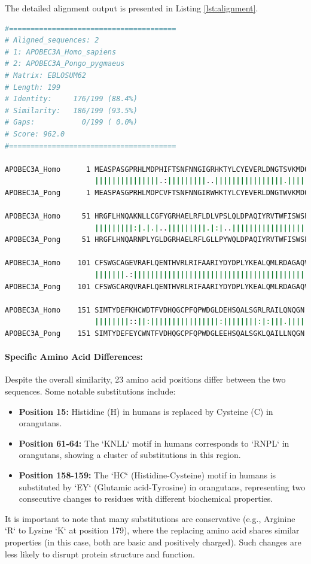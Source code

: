 \documentclass{article}
\begin{document}
The detailed alignment output is presented in Listing \ref{lst:alignment}.

\begin{lstlisting}[language=bash, caption={EMBOSS Needle Alignment Output}, label={lst:alignment}]
#=======================================
# Aligned_sequences: 2
# 1: APOBEC3A_Homo_sapiens
# 2: APOBEC3A_Pongo_pygmaeus
# Matrix: EBLOSUM62
# Length: 199
# Identity:     176/199 (88.4%)
# Similarity:   186/199 (93.5%)
# Gaps:           0/199 ( 0.0%)
# Score: 962.0
#=======================================

APOBEC3A_Homo      1 MEASPASGPRHLMDPHIFTSNFNNGIGRHKTYLCYEVERLDNGTSVKMDQ     50
                     |||||||||||||||.:|||||||||..||||||||||||||||.|||||
APOBEC3A_Pong      1 MEASPASGPRHLMDPCVFTSNFNNGIRWHKTYLCYEVERLDNGTWVKMDQ     50

APOBEC3A_Homo     51 HRGFLHNQAKNLLCGFYGRHAELRFLDLVPSLQLDPAQIYRVTWFISWSP    100
                     |||||||||:|.|.|..|||||||||.|:|..||||||||||||||||||
APOBEC3A_Pong     51 HRGFLHNQARNPLYGLDGRHAELRFLGLLPYWQLDPAQIYRVTWFISWSP    100

APOBEC3A_Homo    101 CFSWGCAGEVRAFLQENTHVRLRIFAARIYDYDPLYKEALQMLRDAGAQV    150
                     |||||||.:|||||||||||||||||||||||||||||||||||||||||
APOBEC3A_Pong    101 CFSWGCARQVRAFLQENTHVRLRIFAARIYDYDPLYKEALQMLRDAGAQV    150

APOBEC3A_Homo    151 SIMTYDEFKHCWDTFVDHQGCPFQPWDGLDEHSQALSGRLRAILQNQGN    199
                     ||||||||::||:||||||||||||||||:||||||||:|:|||.||||
APOBEC3A_Pong    151 SIMTYDEFEYCWNTFVDHQGCPFQPWDGLEEHSQALSGKLQAILLNQGN    199
\end{lstlisting}

\paragraph{Specific Amino Acid Differences:}
Despite the overall similarity, 23 amino acid positions differ between the two sequences. Some notable substitutions include:
\begin{itemize}
    \item \textbf{Position 15:} Histidine (H) in humans is replaced by Cysteine (C) in orangutans.
    \item \textbf{Position 61-64:} The `KNLL` motif in humans corresponds to `RNPL` in orangutans, showing a cluster of substitutions in this region.
    \item \textbf{Position 158-159:} The `HC` (Histidine-Cysteine) motif in humans is substituted by `EY` (Glutamic acid-Tyrosine) in orangutans, representing two consecutive changes to residues with different biochemical properties.
\end{itemize}
It is important to note that many substitutions are conservative (e.g., Arginine `R` to Lysine `K` at position 179), where the replacing amino acid shares similar properties (in this case, both are basic and positively charged). Such changes are less likely to disrupt protein structure and function.
\end{document}
